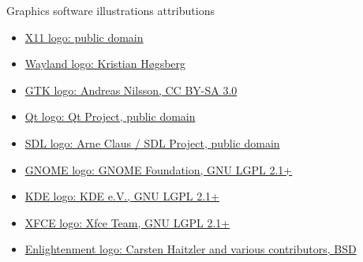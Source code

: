 \begin{frame}{Graphics software illustrations attributions}
  \small
  \begin{itemize}
  \item \href{https://commons.wikimedia.org/wiki/File:X11.svg}{X11 logo: public domain}
  \item \href{https://commons.wikimedia.org/wiki/File:Wayland_Logo.svg}{Wayland logo: Kristian Høgsberg}
  \item \href{https://commons.wikimedia.org/wiki/File:GTK_logo.svg}{GTK logo: Andreas Nilsson, CC BY-SA 3.0}
  \item \href{https://commons.wikimedia.org/wiki/File:GTK_logo.svg}{Qt logo: Qt Project, public domain}
  \item \href{https://commons.wikimedia.org/wiki/File:SDL_Logo.svg}{SDL logo: Arne Claus / SDL Project, public domain}
  \item \href{https://commons.wikimedia.org/wiki/File:Gnomelogo.svg}{GNOME logo: GNOME Foundation, GNU LGPL 2.1+}
  \item \href{https://commons.wikimedia.org/wiki/File:KDE_logo.svg}{KDE logo: KDE e.V., GNU LGPL 2.1+}
  \item \href{https://commons.wikimedia.org/wiki/File:Xfce_logo.svg}{XFCE logo: Xfce Team, GNU LGPL 2.1+}
  \item \href{https://commons.wikimedia.org/wiki/File:Enlightenment_logo_black.png}{Enlightenment logo: Carsten Haitzler and various contributors, BSD}
  \end{itemize}
\end{frame}

